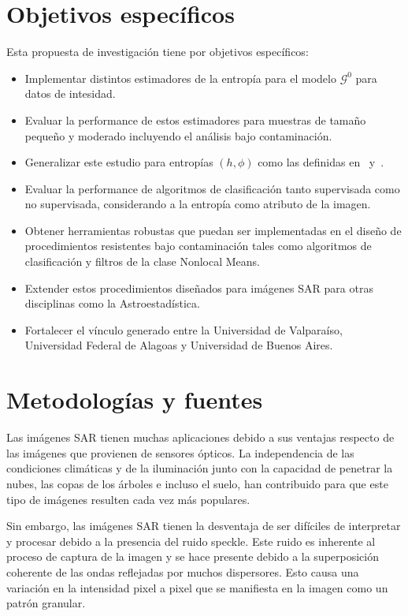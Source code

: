\documentclass[11pt]{article}
\begin{document}
\section{Objetivos específicos}

Esta propuesta de investigación tiene por objetivos específicos:
\begin{itemize}
	\item Implementar distintos estimadores de la entropía para el modelo $\mathcal{G}^0$ para datos de intesidad.
	\item Evaluar la performance de estos estimadores para muestras de tamaño pequeño y moderado incluyendo el análisis bajo contaminación.
	\item Generalizar este estudio para entropías $(h,\phi)$ como las definidas en~\cite{Menendez1997} y~\cite{Salicru1994}. 
	\item Evaluar la performance de algoritmos de clasificación tanto supervisada como no supervisada, considerando a la entropía como atributo de la imagen.
	\item Obtener herramientas robustas que puedan ser implementadas en el diseño de procedimientos resistentes bajo contaminación tales como algoritmos de clasificación y filtros de la clase Nonlocal Means.
	\item Extender estos procedimientos diseñados para imágenes SAR para otras disciplinas como la Astroestadística.
	\item Fortalecer el vínculo generado entre la Universidad de Valparaíso, Universidad Federal de Alagoas y Universidad de Buenos Aires.
\end{itemize}

\section{Metodologías y fuentes}

Las imágenes SAR tienen muchas aplicaciones debido a sus ventajas respecto de las imágenes que provienen de sensores ópticos. La independencia de las condiciones climáticas y de la iluminación junto con la capacidad de penetrar la nubes, las copas de los árboles e incluso el suelo, han contribuido para que este tipo de imágenes resulten cada vez más populares.

Sin embargo, las imágenes SAR tienen la desventaja de ser difíciles de interpretar y procesar debido a la presencia del ruido speckle. Este ruido es inherente al proceso de captura de la imagen y se hace presente debido a la superposición coherente de las ondas reflejadas por muchos dispersores. Esto causa una variación en la intensidad pixel a pixel que se manifiesta en la imagen como un patrón granular. 
\end{document}

